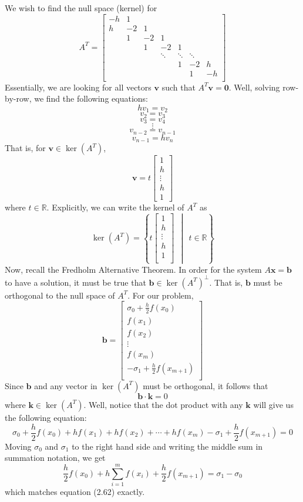\documentclass{article}
\begin{document}
We wish to find the null space (kernel) for 
\[A^T = \begin{bmatrix}
    -h & 1 & & & & & \\
    h & -2 & 1 & & & & \\
     & 1 & -2 & 1 & & & \\
     & & 1 & -2 & 1 & & \\
     & & & \ddots & \ddots & \ddots & \\
     & & & & 1 & -2 & h\\
     & & & & & 1 & -h\\
\end{bmatrix}\]
Essentially, we are looking for all vectors $\textbf{v}$ such that $A^T \textbf{v} = \textbf{0}$. Well, solving row-by-row, we find the following equations:
\[hv_1 = v_2\]
\[v_2 = v_3\]
\[v_3 = v_4\]
\[\vdots\]
\[v_{n-2} = v_{n-1}\]
\[v_{n-1} = hv_n\]
That is, for $\textbf{v} \in \ker (A^T)$,
\[\textbf{v} = t \begin{bmatrix}
    1\\
    h\\
    \vdots\\
    h\\
    1
\end{bmatrix}\]
where $t \in \mathbb{R}$. Explicitly, we can write the kernel of $A^T$ as
\[\ker(A^T) = \left\{ t\begin{bmatrix}
    1\\
    h\\
    \vdots\\
    h\\
    1\\
\end{bmatrix} \:\: \middle| \:\: t \in \mathbb{R} \right\}\]
Now, recall the Fredholm Alternative Theorem. In order for the system $A\textbf{x} = \textbf{b}$ to have a solution, it must be true that $\textbf{b} \in \ker(A^T)^{\perp}$. That is, $\textbf{b}$ must be orthogonal to the null space of $A^T$. For our problem,
\[\textbf{b} = \begin{bmatrix}
    \sigma_0 + \frac{h}{2}f(x_0)\\
    f(x_1)\\
    f(x_2)\\
    \vdots\\
    f(x_m)\\
    -\sigma_1 + \frac{h}{2}f(x_{m+1})\\
\end{bmatrix}\]
Since $\textbf{b}$ and any vector in $\ker(A^T)$ must be orthogonal, it follows that
\[\textbf{b} \cdot \textbf{k} = 0\]
where $\textbf{k} \in \ker(A^T)$. Well, notice that the dot product with any $\textbf{k}$ will give us the following equation:
\[\sigma_0 + \frac{h}{2}f(x_0) + hf(x_1) + hf(x_2) + \cdots + hf(x_m) - \sigma_1 + \frac{h}{2}f(x_{m+1}) = 0\]
Moving $\sigma_0$ and $\sigma_1$ to the right hand side and writing the middle sum in summation notation, we get
\[\frac{h}{2}f(x_0) + h\sum_{i = 1}^mf(x_i) + \frac{h}{2}f(x_{m+1}) = \sigma_1 - \sigma_0\]
which matches equation (2.62) exactly.
\newline
\end{document}
